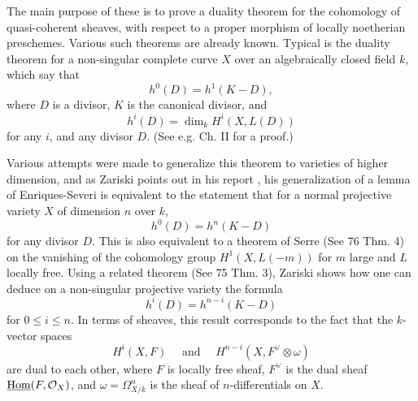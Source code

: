 The main purpose of these is to prove a duality theorem for the cohomology of quasi-coherent sheaves, with respect to a proper morphism of locally noetherian preschemes. Various such theorems are already known. Typical is the duality theorem for a non-singular complete curve $X$ over an algebraically closed field $k$, which say that
\[h^0(D)=h^1(K-D),\]
where $D$ is a divisor, $K$ is the canonical divisor, and 
\[h^{i}(D)=\dim_k H^i(X,L(D))\]
for any $i$, and any divisor $D$. (See e.g. \cite{s1959} Ch. II for a proof.) \par

Various attempts were made to generalize this theorem to varieties of higher dimension, and as Zariski points out in his report \cite{report1956}, his generalization of a lemma of Enriques-Severi \cite{z1952} is equivalent to the statement that for a normal projective variety $X$ of dimension $n$ over $k$,
\[h^0(D)=h^n(K-D)\]
for any divisor $D$. This is also equivalent to a theorem of Serre (See \cite{fac} 76 Thm. 4) on the vanishing of the cohomology group $H^1(X,L(-m))$ for $m$ large and $L$ locally free. Using a related theorem (See \cite{fac} 75 Thm. 3), Zariski shows how one can deduce on a non-singular projective variety the formula
\[h^i(D)=h^{n-i}(K-D)\]
for $0\leq i\leq n$. In terms of sheaves, this result corresponds to the fact that the $k$-vector spaces
\[H^i(X,F)\quad \text{ and } \quad H^{n-i}(X,F^{\vee}\otimes \omega)\]
are dual to each other, where $F$ is locally free sheaf, $F^{\vee}$ is the dual sheaf $\underline{\mathrm{Hom}}(F,\mathcal{O}_X)$, and $\omega=\Omega^n_{X/k}$ is the sheaf of $n$-differentials on $X$.